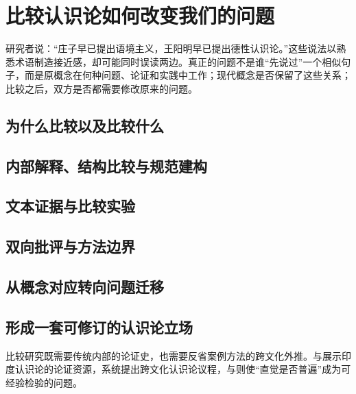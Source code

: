 \chapter{比较认识论如何改变我们的问题}

\begin{openingcase}
研究者说：“庄子早已提出语境主义，王阳明早已提出德性认识论。”这些说法以熟悉术语制造接近感，却可能同时误读两边。真正的问题不是谁“先说过”一个相似句子，而是原概念在何种问题、论证和实践中工作；现代概念是否保留了这些关系；比较之后，双方是否都需要修改原来的问题。
\end{openingcase}

\section{为什么比较以及比较什么}


\section{内部解释、结构比较与规范建构}


\section{文本证据与比较实验}


\section{双向批评与方法边界}



\section{从概念对应转向问题迁移}


\section{形成一套可修订的认识论立场}


比较研究既需要传统内部的论证史，也需要反省案例方法的跨文化外推。\textcite{matilal1986}与\textcite{ganeri2001}展示印度认识论的论证资源，\textcite{mizumoto2018}系统提出跨文化认识论议程，\textcite{weinberg2001}与\textcite{machery2017}则使“直觉是否普遍”成为可经验检验的问题。

